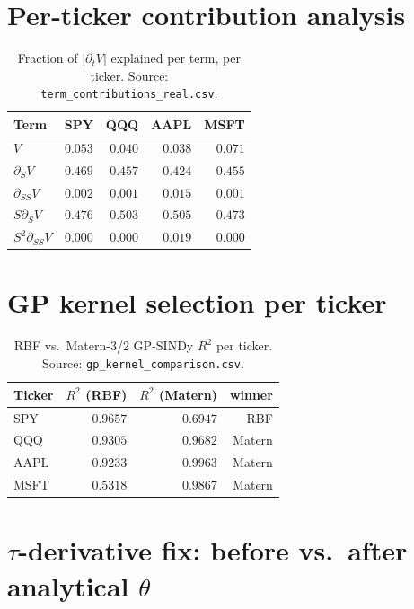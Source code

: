 \documentclass[10pt]{article}
\begin{document}
\section{Per-ticker contribution analysis}\label{app:contrib}
\begin{table}[h]
\centering\footnotesize
\caption{Fraction of $|\partial_t V|$ explained per term, per ticker. Source: \texttt{term\_contributions\_real.csv}.}
\label{tab:contrib-all}
\begin{tabular}{lrrrr}
\toprule
Term & SPY & QQQ & AAPL & MSFT \\
\midrule
$V$ & $0.053$ & $0.040$ & $0.038$ & $0.071$ \\
$\partial_S V$ & $0.469$ & $0.457$ & $0.424$ & $0.455$ \\
$\partial_{SS}V$ & $0.002$ & $0.001$ & $0.015$ & $0.001$ \\
$S\partial_S V$ & $0.476$ & $0.503$ & $0.505$ & $0.473$ \\
$S^2\partial_{SS}V$ & $0.000$ & $0.000$ & $0.019$ & $0.000$ \\
\bottomrule
\end{tabular}
\end{table}

\section{GP kernel selection per ticker}\label{app:kernels}
\begin{table}[h]
\centering\footnotesize
\caption{RBF vs.\ Matern-3/2 GP-SINDy $R^2$ per ticker. Source: \texttt{gp\_kernel\_comparison.csv}.}
\label{tab:kernels}
\begin{tabular}{lrrr}
\toprule
Ticker & $R^2$ (RBF) & $R^2$ (Matern) & winner \\
\midrule
SPY  & $0.9657$ & $0.6947$ & RBF    \\
QQQ  & $0.9305$ & $0.9682$ & Matern \\
AAPL & $0.9233$ & $0.9963$ & Matern \\
MSFT & $0.5318$ & $0.9867$ & Matern \\
\bottomrule
\end{tabular}
\end{table}

\section{$\tau$-derivative fix: before vs.\ after analytical $\theta$}\label{app:tau-fix}
\end{document}
